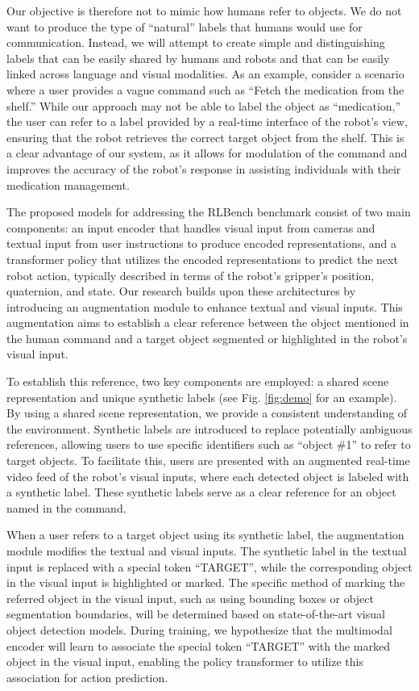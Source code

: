 \documentclass[journal]{IEEEtran}
\begin{document}
Our objective is therefore not to mimic how humans refer to 
objects. We do not want to produce the type of ``natural'' labels 
that humans would use for communication. Instead, we will attempt 
to create simple and distinguishing labels that can be easily 
shared by humans and robots and that can be easily linked across 
language and visual modalities. As an example, consider a scenario 
where a user provides a vague command such as ``Fetch the 
medication from the shelf.'' While our approach may not be 
able to label the object as ``medication,'' the user can refer 
to a label provided by a real-time interface of the robot's 
view, ensuring that the robot retrieves the correct target 
object from the shelf. This is a clear advantage of our 
system, as it allows for modulation of the command and 
improves the accuracy of the robot's response in assisting 
individuals with their medication management.

The proposed models for addressing the RLBench benchmark 
consist of two main components: an input encoder that handles 
visual input from cameras and textual input from user instructions 
to produce encoded representations, and a transformer policy that
utilizes the encoded representations to predict the next robot 
action, typically described in terms of the robot's gripper's 
position, quaternion, and state. Our research builds upon these 
architectures by introducing an augmentation module to enhance 
textual and visual inputs. This augmentation aims to establish 
a clear reference between the object mentioned in the human 
command and a target object segmented or highlighted in the
robot's visual input.

To establish this reference, two key components are employed: 
a shared scene representation and unique synthetic labels
(see Fig. \ref{fig:demo} for an example). 
By using a shared scene representation, we provide a consistent 
understanding of the environment. Synthetic labels are introduced 
to replace potentially ambiguous references, allowing users to 
use specific identifiers such as ``object \#1'' to refer to target 
objects. To facilitate this, users are presented with an augmented 
real-time video feed of the robot's visual inputs, where each 
detected object is labeled with a synthetic label. These synthetic 
labels serve as a clear reference for an object named in the 
command.

When a user refers to a target object using its synthetic label, 
the augmentation module modifies the textual and visual inputs. 
The synthetic label in the textual input is replaced with a special 
token ``TARGET'', while the corresponding object in the visual input
is highlighted or marked. The specific method of marking the referred
object in the visual input, such as using bounding boxes or 
object segmentation boundaries, will be determined based on 
state-of-the-art visual object detection models. During training, 
we hypothesize that the multimodal encoder will learn to associate 
the special token ``TARGET'' with the marked object in the visual 
input, enabling the policy transformer to utilize this association 
for action prediction.
\end{document}

